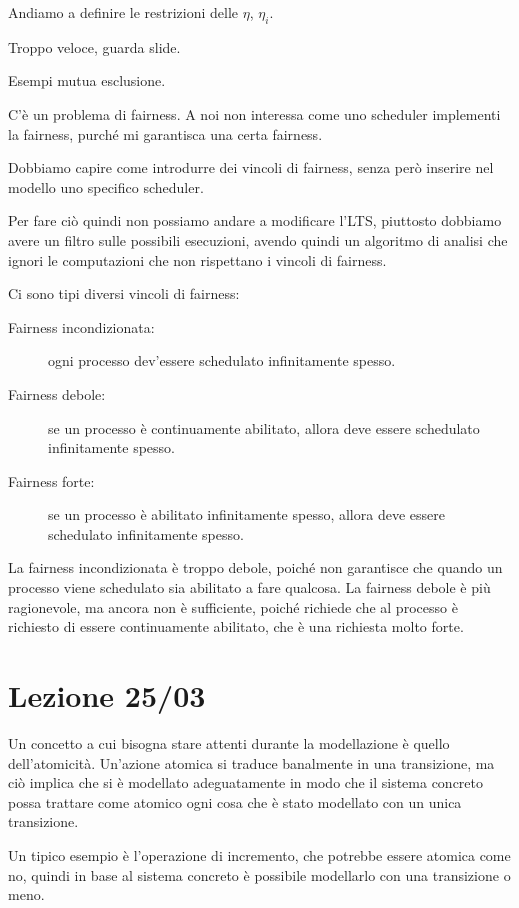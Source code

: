 Andiamo a definire le restrizioni delle \(\eta\), \(\eta_i\).

Troppo veloce, guarda slide.

Esempi mutua esclusione.

C'è un problema di fairness. A noi non interessa come uno scheduler implementi la fairness, purché mi garantisca una certa fairness.

Dobbiamo capire come introdurre dei vincoli di fairness, senza però inserire nel modello uno specifico scheduler.

Per fare ciò quindi non possiamo andare a modificare l'LTS, piuttosto dobbiamo avere un filtro sulle possibili esecuzioni, avendo quindi un algoritmo di analisi che ignori le computazioni che non rispettano i vincoli di fairness.

Ci sono tipi diversi vincoli di fairness:
\begin{description}
  \item[Fairness incondizionata:] ogni processo dev'essere schedulato infinitamente spesso.
  \item[Fairness debole:] se un processo è continuamente abilitato, allora deve essere schedulato infinitamente spesso.
  \item[Fairness forte:] se un processo è abilitato infinitamente spesso, allora deve essere schedulato infinitamente spesso.
\end{description}

La fairness incondizionata è troppo debole, poiché non garantisce che quando un processo viene schedulato sia abilitato a fare qualcosa. La fairness debole è più ragionevole, ma ancora non è sufficiente, poiché richiede che al processo è richiesto di essere continuamente abilitato, che è una richiesta molto forte.

\chapter{Lezione 25/03}

Un concetto a cui bisogna stare attenti durante la modellazione è quello dell'atomicità. Un'azione atomica si traduce banalmente in una transizione, ma ciò implica che si è modellato adeguatamente in modo che il sistema concreto possa trattare come atomico ogni cosa che è stato modellato con un unica transizione.

Un tipico esempio è l'operazione di incremento, che potrebbe essere atomica come no, quindi in base al sistema concreto è possibile modellarlo con una transizione o meno.

